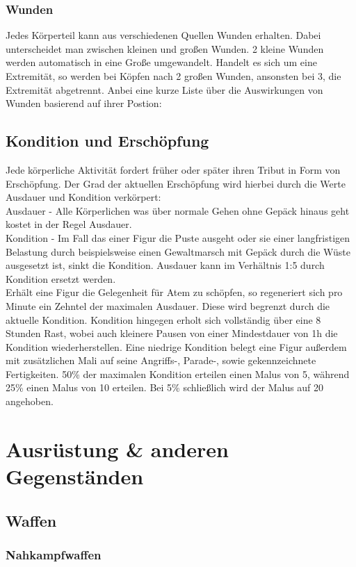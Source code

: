 \documentclass[a4paper,12pt,oneside]{book}
\begin{document}
\section{Wunden}
Jedes Körperteil kann aus verschiedenen Quellen Wunden erhalten. Dabei unterscheidet man zwischen kleinen und großen Wunden. 2 kleine Wunden werden automatisch in eine Große umgewandelt. Handelt es sich um eine Extremität, so werden bei Köpfen nach 2 großen Wunden, ansonsten bei 3, die Extremität abgetrennt. Anbei eine kurze Liste über die Auswirkungen von Wunden basierend auf ihrer Postion:


\chapter{Kondition und Erschöpfung}
Jede körperliche Aktivität fordert früher oder später ihren Tribut in Form von Erschöpfung. Der Grad der aktuellen Erschöpfung wird hierbei durch die Werte Ausdauer und Kondition verkörpert:
\\Ausdauer - Alle Körperlichen was über normale Gehen ohne Gepäck hinaus geht kostet in der Regel Ausdauer.
\\Kondition - Im Fall das einer Figur die Puste ausgeht oder sie einer langfristigen Belastung durch beispielsweise einen Gewaltmarsch mit Gepäck durch die Wüste ausgesetzt ist, sinkt die Kondition. Ausdauer kann im Verhältnis 1:5 durch Kondition ersetzt werden.
\\Erhält eine Figur die Gelegenheit für Atem zu schöpfen, so regeneriert sich pro Minute ein Zehntel der maximalen Ausdauer. Diese wird begrenzt durch die aktuelle Kondition. Kondition hingegen erholt sich vollständig über eine 8 Stunden Rast, wobei auch kleinere Pausen von einer Mindestdauer von 1h die Kondition wiederherstellen.
Eine niedrige Kondition belegt eine Figur außerdem mit zusätzlichen Mali auf seine Angriffs-, Parade-, sowie gekennzeichnete Fertigkeiten.
50\% der maximalen Kondition erteilen einen Malus von 5, während 25\% einen Malus von 10 erteilen. Bei 5\% schließlich wird der Malus auf 20 angehoben.
\part{Ausrüstung \& anderen Gegenständen}
\setcounter{chapter}{0}
\chapter{Waffen}
\section{Nahkampfwaffen}
\end{document}
